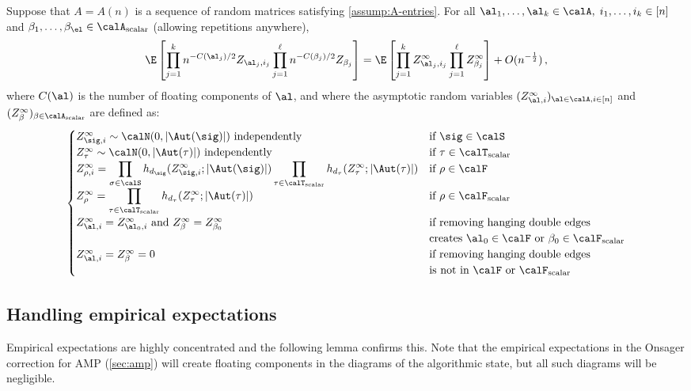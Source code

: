 \documentclass[12pt]{article}
\newcommand{\scalar}{\textnormal{scalar}}
\begin{document}
\begin{theorem}\label{all-moments}
    Suppose that $A = A(n)$ is a sequence of random matrices satisfying \cref{assump:A-entries}.
    For all $\al_1, \dots, \al_k \in \calA, \; i_1, \dots, i_k \in [n]$ and $\beta_1, \dots, \beta_\el \in \calA_\scalar$ (allowing repetitions anywhere), \[
        \E\left[\prod_{j = 1}^k n^{-C(\al_j)/2}Z_{\al_j, i_j} \prod_{j = 1}^\ell n^{-C(\beta_j)/2}Z_{\beta_j} \right] = \E\left[\prod_{j = 1}^k Z_{\al_j,i_j}^\infty \prod_{j = 1}^\ell Z^\infty_{\beta_j} \right] + O(n^{-\frac 12})\,,
    \]
    where $C(\al)$ is the number of floating components of $\al$,
    and where the asymptotic random variables $(Z_{\al,i}^\infty)_{\al \in \calA, i \in [n]}$ and $(Z_\beta^\infty)_{\beta \in \calA_\scalar}$ are defined as:
    \[
    \allowdisplaybreaks
    \begin{cases}
        Z_{\sig,i}^\infty \sim \calN(0, \left|\Aut(\sig)\right|) \text{ independently}& \text{if $\sig \in \calS$}\\
        Z_\tau^\infty \sim \calN(0, \left|\Aut(\tau)\right|) \text{ independently}& \text{if $\tau \in \calT_\scalar$}\\
        \displaystyle Z_{\rho,i}^\infty = \prod_{\sigma \in \calS} h_{d_\sig}(Z_{\sig,i}^\infty; \left|\Aut(\sig)\right|) \prod_{\tau \in \calT_\scalar} h_{d_{\tau}}(Z_\tau^\infty; \left|\Aut(\tau)\right|) & \text{if $\rho \in \calF$}\\
        \displaystyle Z_\rho^\infty = \prod_{\tau \in \calT_\scalar} h_{d_{\tau}}(Z_\tau^\infty; \left|\Aut(\tau)\right|) & \text{if $\rho \in \calF_\scalar$}\\
        Z_{\al,i}^\infty = Z_{\al_0, i}^\infty  \text{ and }Z_\beta^\infty = Z_{\beta_0}^\infty & \text{if removing hanging double edges}\\&\text{creates $\al_0 \in \calF$ or $\beta_0 \in \calF_\scalar$}\\
        Z_{\al,i}^\infty = Z_\beta^\infty = 0 & \text{if removing hanging double edges}\\&\text{is not in $\calF$ or $\calF_\scalar$} \end{cases}
    \]
\end{theorem} 

\subsection{Handling empirical expectations}
\label{sec:onsager-correction}

Empirical expectations are highly concentrated and the following lemma confirms this.
Note that the empirical expectations in the Onsager correction for AMP (\cref{sec:amp}) will create floating
components in the diagrams of the algorithmic state, but all such diagrams will be negligible.
\end{document}
